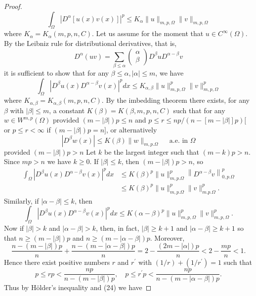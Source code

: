 \begin{proof}
  \[
  \int_{\Omega}\left|D^\alpha[u(x) v(x)]\right|^p \leq K_\alpha\|u\|_{m, p, \Omega}\|v\|_{m, p, \Omega}
  \]
  where $K_\alpha=K_\alpha(m, p, n, C)$. Let us assume for the moment that $u \in C^{\infty}(\Omega)$. By the Leibniz rule for distributional derivatives, that is,
  \[
  D^\alpha(u v)=\sum_{\beta \leq \alpha}\left(\begin{array}{l}
  \alpha \\
  \beta
  \end{array}\right) D^\beta u D^{\alpha-\beta} v
  \]
  it is sufficient to show that for any $\beta \leq \alpha,|\alpha| \leq m$, we have
  \[
  \int_{\Omega}\left|D^\beta u(x) D^{\alpha-\beta} v(x)\right|^p d x \leq K_{\alpha, \beta}\|u\|_{m, p, \Omega}^p\|v\|_{m, p, \Omega}^p
  \]
  where $K_{\alpha, \beta}=K_{\alpha, \beta}(m, p, n, C)$. By the imbedding theorem there exists, for any $\beta$ with $|\beta| \leq m$, a constant $K(\beta)=K(\beta, m, p, n, C)$ such that for any $w \in W^{m,p}(\Omega)$
  provided $(m-|\beta|) p \leq n$ and $p \leq r \leq n p /(n-[m-|\beta|] p)[$ or $p \leq r<\infty$ if $(m-|\beta|) p=n]$, or alternatively
  \[
  \left|D^\beta w(x)\right| \leq K(\beta)\|w\|_{m, p . \Omega} \quad \text { a.e. in } \Omega
  \]
  provided $(m-|\beta|) p>n$
  Let $k$ be the largest integer such that $(m-k) p>n$. Since $m p>n$ we have $k \geq 0$. If $|\beta| \leq k$, then $(m-|\beta|) p>n$, so
  \[
  \begin{aligned}
  \int_{\Omega}\left|D^\beta u(x) D^{\alpha-\beta} v(x)\right|^p d x & \leq K(\beta)^p\|u\|_{m, p . \Omega}^p\left\|D^{\alpha-\beta} v\right\|_{0, p . \Omega}^p \\
  & \leq K(\beta)^p\|u\|_{m, p . \Omega}^p\|v\|_{m . p . \Omega}^p .
  \end{aligned}
  \]
  Similarly, if $|\alpha-\beta| \leq k$, then
  \[
  \int_{\Omega}\left|D^\beta u(x) D^{\alpha-\beta} v(x)\right|^p d x \leq K(\alpha-\beta)^p\|u\|_{m, p, \Omega}^p\|v\|_{m, p, \Omega}^p .
  \]
  Now if $|\beta|>k$ and $|\alpha-\beta|>k$, then, in fact, $|\beta| \geq k+1$ and $|\alpha-\beta| \geq k+1$ so that $n \geq(m-|\beta|) p$ and $n \geq(m-|\alpha-\beta|) p$. Moreover,
  \[
  \frac{n-(m-|\beta|) p}{n}+\frac{n-(m-|\alpha-\beta|) p}{n}=2-\frac{(2 m-|\alpha|) p}{n}<2-\frac{m p}{n}<1 .
  \]
  Hence there exist positive numbers $r$ and $r^{\prime}$ with $(1 / r)+\left(1 / r^{\prime}\right)=1$ such that
  \[
  p \leq r p<\frac{n p}{n-(m-|\beta|) p}, \quad p \leq r^{\prime} p<\frac{n p}{n-(m-|\alpha-\beta|) p} .
  \]
  Thus by Hölder's inequality and (24) we have

\end{proof}
